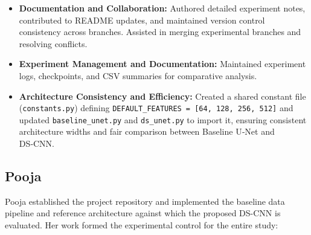 \documentclass[conference]{IEEEtran}
\begin{document}
\begin{itemize}
    \item \textbf{Documentation and Collaboration:} Authored detailed experiment notes, contributed to README updates, and maintained version control consistency across branches. Assisted in merging experimental branches and resolving conflicts.
    
    \item \textbf{Experiment Management and Documentation:} Maintained experiment logs, checkpoints, and CSV summaries for comparative analysis.
    
    \item \textbf{Architecture Consistency and Efficiency:} Created a shared constant file (\texttt{constants.py}) defining \texttt{DEFAULT\_FEATURES = [64, 128, 256, 512]} and updated \texttt{baseline\_unet.py} and \texttt{ds\_unet.py} to import it, ensuring consistent architecture widths and fair comparison between Baseline U‑Net and DS‑CNN.
\end{itemize}

\subsection{\textbf{Pooja}}

Pooja established the project repository and implemented the baseline data pipeline and reference architecture against which the proposed DS-CNN is evaluated. Her work formed the experimental control for the entire study:
\end{document}

